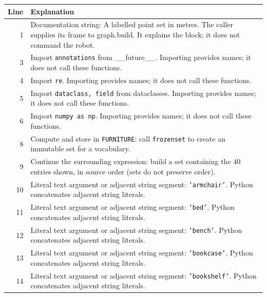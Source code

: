 \documentclass[11pt,a4paper]{book}
\begin{document}
\begin{longtable}{r p{}}

\textbf{Line} & \textbf{Explanation} \\ \hline \endhead

1 & Documentation string: A labelled point set in metres. The caller supplies its frame to graph.build. It explains the block; it does not command the robot. \\

3 & Import \texttt{annotations} from \_\_future\_\_. Importing provides names; it does not call these functions. \\

4 & Import \texttt{re}. Importing provides names; it does not call these functions. \\

5 & Import \texttt{dataclass, field} from dataclasses. Importing provides names; it does not call these functions. \\

6 & Import \texttt{numpy as np}. Importing provides names; it does not call these functions. \\

8 & Compute and store in \texttt{FURNITURE}: call \texttt{frozenset} to create an immutable set for a vocabulary.  \\

9 & Continue the surrounding expression: build a set containing the 40 entries shown, in source order (sets do not preserve order). \\

10 & Literal text argument or adjacent string segment: \texttt{'armchair'}. Python concatenates adjacent string literals. \\

11 & Literal text argument or adjacent string segment: \texttt{'bed'}. Python concatenates adjacent string literals. \\

12 & Literal text argument or adjacent string segment: \texttt{'bench'}. Python concatenates adjacent string literals. \\

13 & Literal text argument or adjacent string segment: \texttt{'bookcase'}. Python concatenates adjacent string literals. \\

14 & Literal text argument or adjacent string segment: \texttt{'bookshelf'}. Python concatenates adjacent string literals. \\


\end{longtable}
\end{document}
